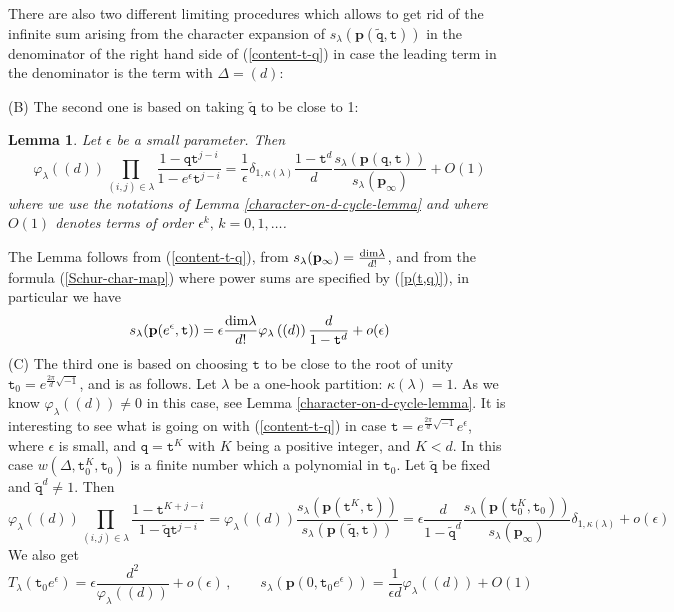 \documentclass[a4paper,10pt]{article}
\newcommand{\bpow}{\mathbf{p}}
\theoremstyle{plain}
\newtheorem{Lemma}{Lemma}
\theoremstyle{remark}
\def\bl{\begin{Lemma}}
\def\el{\end{Lemma}}
\def\be{\begin{equation}}
\def\ee{\end{equation}}
\begin{document}
There are also two different limiting procedures which allows to get rid of the infinite sum arising from
the character expansion of $s_\lambda(\bpow(\tilde{\texttt{q}},\texttt{t}))$
in the denominator of the right hand side of (\ref{content-t-q}) in case the leading term in the denominator
is the term with $\Delta=(d)$:

(B) The second one is based on taking $\tilde{\texttt{q}}$ to be close to 1:
 \bl Let $\epsilon$ be a small parameter. Then
 \be\label{epsilon-t}
 \varphi_\lambda\left((d)\right) \prod_{(i,j)\in\lambda}\frac{1-\texttt{q}\texttt{t}^{j-i}}{1-e^\epsilon\texttt{t}^{j-i}}=
 \frac{1}{\epsilon} \delta_{1,\kappa(\lambda)} \frac{1-\texttt{t}^d}{d}
\frac{s_\lambda(\bpow(\texttt{q},\texttt{t}))}{s_\lambda(\bpow_\infty)} + O(1)
\ee
 where we use the notations of Lemma \ref{character-on-d-cycle-lemma} and
 where $O(1)$ denotes terms of order $\epsilon^{k},\,k=0,1,\dots$.
 \el
 The Lemma follows from (\ref{content-t-q}), from $s_\lambda(\bpow_\infty)=\frac{{\rm dim}\lambda}{d!}$, and from the
 formula (\ref{Schur-char-map}) where power sums are specified by (\ref{p(t,q)}),
 in particular we have
 \be
 s_\lambda(\bpow(e^\epsilon,\texttt{t}))=\epsilon \frac{{\rm dim}\lambda}{d!}\varphi_\lambda\left((d)\right)\frac{d}{1-\texttt{t}^d}
 + o(\epsilon)
 \ee
 (C) The third one is based on choosing $\texttt{t}$ to be close to the root of unity $\texttt{t}_0=e^{\frac{2\pi}{d}\sqrt{-1}}$,
 and is as follows.
 Let $\lambda$ be a one-hook partition: $\kappa(\lambda)=1$. As we know $\varphi_\lambda\left((d)\right)\neq 0$ in this case, see Lemma
 \ref{character-on-d-cycle-lemma}.
It is interesting to see what is going on with (\ref{content-t-q}) in case
$\texttt{t}=e^{\frac{2\pi}{d}\sqrt{-1}}e^\epsilon$, where $\epsilon$ is small,
and $\texttt{q}=\texttt{t}^K$ with $K$ being a positive integer, and $K<d$. In this case $w(\Delta,\texttt{t}_0^K,\texttt{t}_0) $
is a finite number which a polynomial in $\texttt{t}_0$. Let $\tilde{\texttt{q}}$ be fixed and $\tilde{\texttt{q}}^d \neq 1$. Then
 \be
\varphi_\lambda\left((d)\right) \prod_{(i,j)\in\lambda} \frac{1-\texttt{t}^{K+j-i}}{1-\tilde{\texttt{q}}\texttt{t}^{j-i}} =
\varphi_\lambda\left((d)\right)\frac{s_\lambda(\bpow(\texttt{t}^K,\texttt{t}))}{s_\lambda(\bpow(\tilde{\texttt{q}},\texttt{t}))}=
\epsilon \frac{d}{1-\tilde{\texttt{q}}^d} \frac{s_\lambda(\bpow(\texttt{t}_0^K,\texttt{t}_0))}{s_\lambda(\bpow_\infty)}
\delta_{1,\kappa(\lambda)}
+o(\epsilon)
 \ee
 We also get
\[
 T_\lambda(\texttt{t}_0e^\epsilon)=\epsilon \frac{d^2}{\varphi_\lambda\left((d)\right)}+o(\epsilon)\,,
 \qquad
s_\lambda(\bpow(0,\texttt{t}_0e^\epsilon))=\frac{1}{\epsilon d}{\varphi_\lambda\left((d)\right)} +
O(1)
\]
\end{document}
